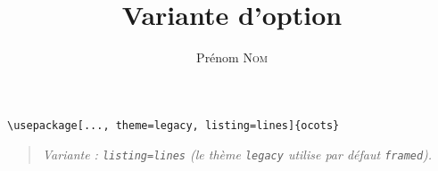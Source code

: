 \documentclass[11pt]{ocots-book}
\title{Variante d'option}
\author{Prénom \textsc{Nom}}
\newcommand{\ocotsvariantnote}[1]{\begin{quote}\itshape Variante : #1\end{quote}}
\begin{document}
\maketitle

\begin{lstlisting}
\usepackage[..., theme=legacy, listing=lines]{ocots}
\end{lstlisting}
\ocotsvariantnote{\texttt{listing=lines} (le th\`eme \texttt{legacy} utilise par d\'efaut \texttt{framed}).}

\end{document}
